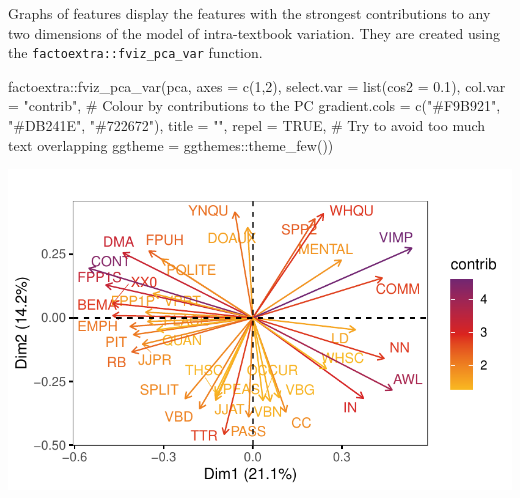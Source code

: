 \documentclass[
  letterpaper,
  DIV=11,
  numbers=noendperiod]{scrreprt}
\newenvironment{Shaded}{\begin{snugshade}}{\end{snugshade}}
\newcommand{\AttributeTok}[1]{\textcolor[rgb]{0.40,0.45,0.13}{#1}}
\newcommand{\CommentTok}[1]{\textcolor[rgb]{0.37,0.37,0.37}{#1}}
\newcommand{\ConstantTok}[1]{\textcolor[rgb]{0.56,0.35,0.01}{#1}}
\newcommand{\DecValTok}[1]{\textcolor[rgb]{0.68,0.00,0.00}{#1}}
\newcommand{\FloatTok}[1]{\textcolor[rgb]{0.68,0.00,0.00}{#1}}
\newcommand{\FunctionTok}[1]{\textcolor[rgb]{0.28,0.35,0.67}{#1}}
\newcommand{\NormalTok}[1]{\textcolor[rgb]{0.00,0.23,0.31}{#1}}
\newcommand{\SpecialCharTok}[1]{\textcolor[rgb]{0.37,0.37,0.37}{#1}}
\newcommand{\StringTok}[1]{\textcolor[rgb]{0.13,0.47,0.30}{#1}}
\begin{document}
Graphs of features display the features with the strongest contributions
to any two dimensions of the model of intra-textbook variation. They are
created using the \texttt{factoextra::fviz\_pca\_var} function.

\begin{Shaded}
\begin{Highlighting}[]
\NormalTok{factoextra}\SpecialCharTok{::}\FunctionTok{fviz\_pca\_var}\NormalTok{(pca,}
             \AttributeTok{axes =} \FunctionTok{c}\NormalTok{(}\DecValTok{1}\NormalTok{,}\DecValTok{2}\NormalTok{),}
             \AttributeTok{select.var =} \FunctionTok{list}\NormalTok{(}\AttributeTok{cos2 =} \FloatTok{0.1}\NormalTok{),}
             \AttributeTok{col.var =} \StringTok{"contrib"}\NormalTok{, }\CommentTok{\# Colour by contributions to the PC}
             \AttributeTok{gradient.cols =} \FunctionTok{c}\NormalTok{(}\StringTok{"\#F9B921"}\NormalTok{, }\StringTok{"\#DB241E"}\NormalTok{, }\StringTok{"\#722672"}\NormalTok{),}
             \AttributeTok{title =} \StringTok{""}\NormalTok{,}
             \AttributeTok{repel =} \ConstantTok{TRUE}\NormalTok{, }\CommentTok{\# Try to avoid too much text overlapping}
             \AttributeTok{ggtheme =}\NormalTok{ ggthemes}\SpecialCharTok{::}\FunctionTok{theme\_few}\NormalTok{())}
\end{Highlighting}
\end{Shaded}

\includegraphics{E_Ch6_Analysis_files/figure-pdf/graphs-of-variables-1.pdf}
\end{document}
